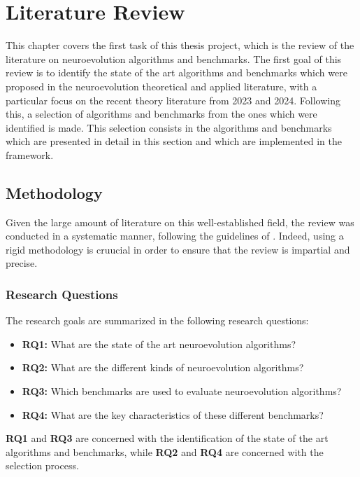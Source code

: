 \chapter{Literature Review}
\label{chap:review}

This chapter covers the first task of this thesis project, which is the review of the literature on neuroevolution algorithms and benchmarks.
The first goal of this review is to identify the state of the art algorithms and benchmarks which were proposed in the neuroevolution theoretical and applied literature, with a particular
focus on the recent theory literature from 2023 and 2024. Following this, a selection of algorithms and benchmarks from the ones which were identified is made.
This selection consists in the algorithms and benchmarks which are presented in detail in this section and which are implemented in the framework.

\section{Methodology}

Given the large amount of literature on this well-established field, the review was conducted in a systematic manner, following the guidelines of \cite{snowballing,systematic_review}.
Indeed, using a rigid methodology is cruucial in order to ensure that the review is impartial and precise.

\subsection{Research Questions}

The research goals are summarized in the following research questions:

\begin{itemize}
    \item \textbf{RQ1:} What are the state of the art neuroevolution algorithms?
    \item \textbf{RQ2:} What are the different kinds of neuroevolution algorithms?
    \item \textbf{RQ3:} Which benchmarks are used to evaluate neuroevolution algorithms?
    \item \textbf{RQ4:} What are the key characteristics of these different benchmarks?
\end{itemize}

\textbf{RQ1} and \textbf{RQ3} are concerned with the identification of the state of the art algorithms and benchmarks, while \textbf{RQ2} and \textbf{RQ4} are concerned
with the selection process.

